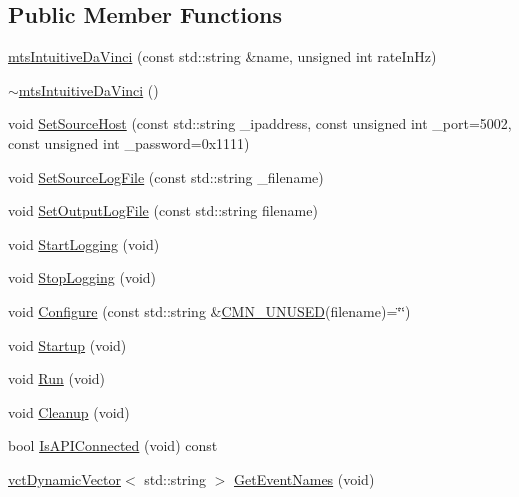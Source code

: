 \subsection*{Public Member Functions}
\begin{DoxyCompactItemize}
\item 
\hyperlink{classmts_intuitive_da_vinci_a8d26d40fcc5c8051b78d9f3492444124}{mts\-Intuitive\-Da\-Vinci} (const std\-::string \&name, unsigned int rate\-In\-Hz)
\item 
\hyperlink{classmts_intuitive_da_vinci_abd5651fd920d3b747c45e77f2fb6ddfd}{$\sim$mts\-Intuitive\-Da\-Vinci} ()
\item 
void \hyperlink{classmts_intuitive_da_vinci_aee33ea9b82f51a020f8be32fe9f07368}{Set\-Source\-Host} (const std\-::string \-\_\-ipaddress, const unsigned int \-\_\-port=5002, const unsigned int \-\_\-password=0x1111)
\item 
void \hyperlink{classmts_intuitive_da_vinci_afbf403f4b19fb9151d442d509390a7f3}{Set\-Source\-Log\-File} (const std\-::string \-\_\-filename)
\item 
void \hyperlink{classmts_intuitive_da_vinci_ae00f71b53c921f5640b5d9612f493d7e}{Set\-Output\-Log\-File} (const std\-::string filename)
\item 
void \hyperlink{classmts_intuitive_da_vinci_a0c4255c252999d91d3d983e7c9e01e6f}{Start\-Logging} (void)
\item 
void \hyperlink{classmts_intuitive_da_vinci_a55c2ab4b4af7da54bc185149a1884795}{Stop\-Logging} (void)
\item 
void \hyperlink{classmts_intuitive_da_vinci_a98409faa6d3f51b2bd153df262b4db59}{Configure} (const std\-::string \&\hyperlink{cmn_portability_8h_a021894e2626935fa2305434b1e893ff6}{C\-M\-N\-\_\-\-U\-N\-U\-S\-E\-D}(filename)=\char`\"{}\char`\"{})
\item 
void \hyperlink{classmts_intuitive_da_vinci_a47328f5b6d6bfc477d9d53e1d829f144}{Startup} (void)
\item 
void \hyperlink{classmts_intuitive_da_vinci_a8b6c9c77958c2726d1e7ae46d0e34ee2}{Run} (void)
\item 
void \hyperlink{classmts_intuitive_da_vinci_ac9c5b49157176eee514f74585a88d994}{Cleanup} (void)
\item 
bool \hyperlink{classmts_intuitive_da_vinci_a55eab0998d7da801e07b0cf4f5f36701}{Is\-A\-P\-I\-Connected} (void) const 
\item 
\hyperlink{classvct_dynamic_vector}{vct\-Dynamic\-Vector}$<$ std\-::string $>$ \hyperlink{classmts_intuitive_da_vinci_a3ba221cd74097609b03a8061b50361ee}{Get\-Event\-Names} (void)
\end{DoxyCompactItemize}
